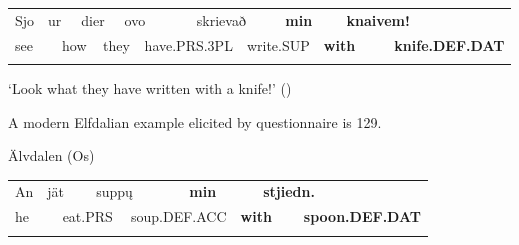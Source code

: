 \begin{tabular}{llllllllllllll}
\lsptoprule
Sjo & \multicolumn{2}{l}{ur

} & \multicolumn{2}{l}{dier

} & \multicolumn{2}{l}{ovo

} & \multicolumn{2}{l}{skrievað

} & \multicolumn{2}{l}{{\bfseries min}

} & \multicolumn{2}{l}{{\bfseries knaivem!}

} & \\
\multicolumn{2}{l}{see

} & \multicolumn{2}{l}{how

} & \multicolumn{2}{l}{they

} & \multicolumn{2}{l}{have.PRS.3PL

} & \multicolumn{2}{l}{write.SUP

} & \multicolumn{2}{l}{{\bfseries with}

} & \multicolumn{2}{l}{{\bfseries knife.DEF.DAT}

}\\
\lspbottomrule
\end{tabular}

\begin{styleTranslation}
‘Look what they have written with a knife!’ (\citet[125]{Levander1909})

\end{styleTranslation}

A modern Elfdalian example elicited by questionnaire is 129.

\begin{listWWNumileveli}
\item 

\begin{styleExample}
\label{bkm:Ref224103303}Älvdalen (Os)

\end{styleExample}

\end{listWWNumileveli}

\begin{tabular}{llllllllll}
\lsptoprule
An & \multicolumn{2}{l}{jät

} & \multicolumn{2}{l}{supp\k{u}

} & \multicolumn{2}{l}{{\bfseries min}

} & \multicolumn{2}{l}{{\bfseries stjiedn.}

} & \\
\multicolumn{2}{l}{he

} & \multicolumn{2}{l}{eat.PRS

} & \multicolumn{2}{l}{soup.DEF.ACC

} & \multicolumn{2}{l}{{\bfseries with}

} & \multicolumn{2}{l}{{\bfseries spoon.DEF.DAT}

}\\
\lspbottomrule
\end{tabular}

